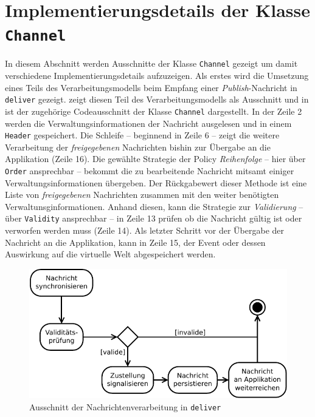 

\section{Implementierungsdetails der Klasse \texttt{Channel}}
\label{chap:impl:channel}
In diesem Abschnitt werden Ausschnitte der Klasse \texttt{Channel} gezeigt um damit verschiedene Implementierungsdetails aufzuzeigen. Als erstes wird die Umsetzung eines Teils des Verarbeitungsmodells beim Empfang einer \emph{Publish}-Nachricht in \texttt{deliver} gezeigt.  zeigt diesen Teil des Verarbeitungsmodells als Ausschnitt und in  ist der zugehörige Codeausschnitt der Klasse \texttt{Channel} dargestellt. In der Zeile 2 werden die Verwaltungsinformationen der Nachricht ausgelesen und in einem \texttt{Header} gespeichert.  Die Schleife -- beginnend in Zeile 6 -- zeigt die weitere Verarbeitung der \emph{freigegebenen} Nachrichten bishin zur Übergabe an die Applikation (Zeile 16). Die gewählte Strategie der Policy \emph{Reihenfolge} -- hier über \texttt{Order} ansprechbar -- bekommt die zu bearbeitende Nachricht mitsamt einiger Verwaltungsinformationen übergeben. Der Rückgabewert dieser Methode ist eine Liste von \emph{freigegebenen} Nachrichten zusammen mit den weiter benötigten Verwaltunsginformationen. Anhand diesen, kann die Strategie zur \emph{Validierung} -- über \texttt{Validity} ansprechbar -- in Zeile 13 prüfen ob die Nachricht gültig ist oder verworfen werden muss (Zeile 14). Als letzter Schritt vor der Übergabe der Nachricht an die Applikation, kann in Zeile 15, der Event oder dessen Auswirkung auf die virtuelle Welt abgespeichert werden.



\begin{figure}[htbp]
\centering
\includegraphics{grafics/processing_deliver_ovpd.pdf}%
\caption{Ausschnitt der Nachrichtenverarbeitung in \texttt{deliver}}
\label{fig:processing_deliver_ovpd}
\end{figure}

